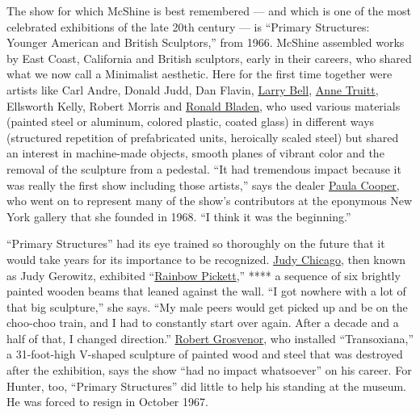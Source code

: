The show for which McShine is best remembered --- and which is one of
the most celebrated exhibitions of the late 20th century --- is
``Primary Structures: Younger American and British Sculptors,'' from
1966. McShine assembled works by East Coast, California and British
sculptors, early in their careers, who shared what we now call a
Minimalist aesthetic. Here for the first time together were artists like
Carl Andre, Donald Judd, Dan Flavin,
\href{https://www.nytimes.com/2018/06/15/t-magazine/mary-heilmann-larry-bell-conversation.html}{Larry
Bell},
\href{https://www.nytimes.com/2018/11/21/t-magazine/female-land-artists.html}{Anne
Truitt}, Ellsworth Kelly, Robert Morris and
\href{https://www.nytimes.com/1988/02/04/obituaries/ronald-bladen-69-sculptor-famed-for-stark-poetic-images.html}{Ronald
Bladen}, who used various materials (painted steel or aluminum, colored
plastic, coated glass) in different ways (structured repetition of
prefabricated units, heroically scaled steel) but shared an interest in
machine-made objects, smooth planes of vibrant color and the removal of
the sculpture from a pedestal. ``It had tremendous impact because it was
really the first show including those artists,'' says the dealer
\href{https://www.nytimes.com/slideshow/2016/10/11/t-magazine/my-life-in-pictures-paula-cooper/s/paula-cooper-slide-010G.html}{Paula
Cooper}, who went on to represent many of the show's contributors at the
eponymous New York gallery that she founded in 1968. ``I think it was
the beginning.''

``Primary Structures'' had its eye trained so thoroughly on the future
that it would take years for its importance to be recognized.
\href{https://www.nytimes.com/2018/02/07/t-magazine/judy-chicago-dinner-party.html}{Judy
Chicago}, then known as Judy Gerowitz, exhibited
``\href{https://www.artsy.net/artwork/judy-chicago-rainbow-pickett}{Rainbow
Pickett},'' **** a sequence of six brightly painted wooden beams that
leaned against the wall. ``I got nowhere with a lot of that big
sculpture,'' she says. ``My male peers would get picked up and be on the
choo-choo train, and I had to constantly start over again. After a
decade and a half of that, I changed direction.''
\href{https://www.paulacoopergallery.com/artists/robert-grosvenor/selected-works}{Robert
Grosvenor}, who installed ``Transoxiana,'' a 31-foot-high V-shaped
sculpture of painted wood and steel that was destroyed after the
exhibition, says the show ``had no impact whatsoever'' on his career.
For Hunter, too, ``Primary Structures'' did little to help his standing
at the museum. He was forced to resign in October 1967.

